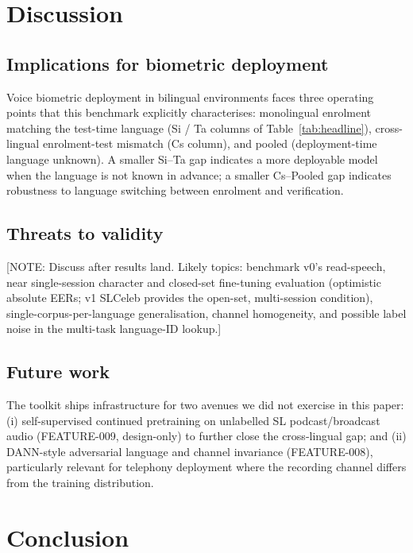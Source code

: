 \documentclass[11pt,a4paper]{article}
\begin{document}
\section{Discussion}
\label{sec:discussion}

\subsection{Implications for biometric deployment}
\label{sec:disc:deploy}

Voice biometric deployment in bilingual environments faces three
operating points that this benchmark explicitly characterises:
monolingual enrolment matching the test-time language (Si / Ta
columns of Table~\ref{tab:headline}), cross-lingual enrolment-test
mismatch (Cs column), and pooled (deployment-time language unknown).
A smaller Si--Ta gap indicates a more deployable model when the
language is not known in advance; a smaller Cs--Pooled gap indicates
robustness to language switching between enrolment and verification.

\subsection{Threats to validity}
\label{sec:disc:threats}

[NOTE: Discuss after results land. Likely topics: benchmark v0's
read-speech, near single-session character and closed-set fine-tuning
evaluation (optimistic absolute EERs; v1 SLCeleb provides the
open-set, multi-session condition), single-corpus-per-language
generalisation, channel homogeneity, and possible label noise in the
multi-task language-ID lookup.]

\subsection{Future work}
\label{sec:disc:future}

The toolkit ships infrastructure for two avenues we did not exercise
in this paper: (i) self-supervised continued pretraining on
unlabelled SL podcast/broadcast audio (FEATURE-009, design-only)
to further close the cross-lingual gap; and (ii) DANN-style adversarial
language and channel invariance (FEATURE-008), particularly relevant
for telephony deployment where the recording channel differs from
the training distribution.

\section{Conclusion}
\label{sec:conclusion}
\end{document}
